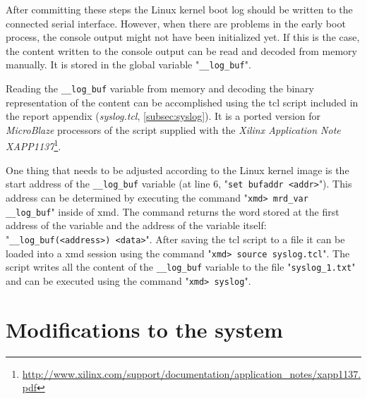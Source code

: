 After committing these steps the Linux kernel boot log should be written to the connected serial interface. However, when there are problems in the early boot process, the console output might not have been initialized yet. If this is the case, the content written to the console output can be read and decoded from memory manually. It is stored in the global variable "\texttt{\_\_log\_buf}".

Reading the \texttt{\_\_log\_buf} variable from memory and decoding the binary representation of the content can be accomplished using the \gls{tcl} script included in the report appendix (\textit{syslog.tcl}, \ref{subsec:syslog}). It is a ported version for \textit{MicroBlaze} processors of the script supplied with the \textit{Xilinx Application Note XAPP1137}\footnote{\url{http://www.xilinx.com/support/documentation/application\_notes/xapp1137.pdf}}. 

One thing that needs to be adjusted according to the Linux kernel image is the start address of the \texttt{\_\_log\_buf} variable (at line 6, "\texttt{set bufaddr <addr>}"). This address can be determined by executing the command "\texttt{xmd> mrd\_var \_\_log\_buf}" inside of \gls{xmd}. The command returns the word stored at the first address of the variable and the address of the variable itself: "\texttt{\_\_log\_buf(<address>)   <data>}". After saving the \gls{tcl} script to a file it can be loaded into a \gls{xmd} session using the command "\texttt{xmd> source syslog.tcl}". The script writes all the content of the \texttt{\_\_log\_buf} variable to the file "\texttt{syslog\_1.txt}" and can be executed using the command "\texttt{xmd> syslog}".


\chapter{Modifications to the system}

